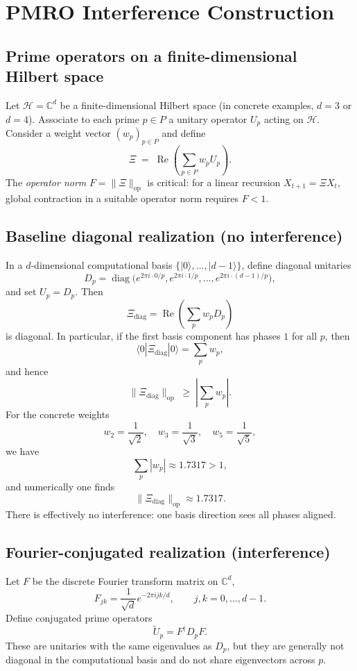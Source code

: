 \documentclass[11pt]{article}
\begin{document}
\section{PMRO Interference Construction}

\subsection{Prime operators on a finite-dimensional Hilbert space}

Let $\mathcal{H}=\mathbb{C}^d$ be a finite-dimensional Hilbert space (in concrete examples, $d=3$ or $d=4$). Associate to each prime $p\in P$ a unitary operator $U_p$ acting on $\mathcal{H}$. Consider a weight vector $(w_p)_{p\in P}$ and define
\[
  \Xi \;=\; \operatorname{Re}\!\left(\sum_{p\in P} w_p U_p\right).
\]
The \emph{operator norm} $F=\|\Xi\|_{\mathrm{op}}$ is critical: for a linear recursion $X_{t+1}=\Xi X_t$, global contraction in a suitable operator norm requires $F<1$.

\subsection{Baseline diagonal realization (no interference)}

In a $d$-dimensional computational basis $\{|0\rangle,\dots,|d-1\rangle\}$, define diagonal unitaries
\[
  D_p = \operatorname{diag}\bigl(e^{2\pi i \cdot 0/p}, e^{2\pi i \cdot 1/p}, \dots, e^{2\pi i \cdot (d-1)/p}\bigr),
\]
and set $U_p=D_p$. Then
\[
  \Xi_{\text{diag}} = \operatorname{Re}\left(\sum_{p} w_p D_p\right)
\]
is diagonal. In particular, if the first basis component has phases $1$ for all $p$, then
\[
  \langle 0|\Xi_{\text{diag}}|0\rangle = \sum_{p} w_p,
\]
and hence
\[
  \|\Xi_{\text{diag}}\|_{\mathrm{op}} \;\geq\; \left|\sum_p w_p\right|.
\]
For the concrete weights
\[
  w_2 = \frac{1}{\sqrt{2}},\quad
  w_3 = \frac{1}{\sqrt{3}},\quad
  w_5 = \frac{1}{\sqrt{5}},
\]
we have
\[
  \sum_p |w_p| \approx 1.7317 > 1,
\]
and numerically one finds
\[
  \|\Xi_{\text{diag}}\|_{\mathrm{op}} \approx 1.7317.
\]
There is effectively no interference: one basis direction sees all phases aligned.

\subsection{Fourier-conjugated realization (interference)}

Let $F$ be the discrete Fourier transform matrix on $\mathbb{C}^d$,
\[
  F_{jk} = \frac{1}{\sqrt{d}} e^{-2\pi i jk/d},\qquad j,k=0,\dots,d-1.
\]
Define conjugated prime operators
\[
  \tilde{U}_p = F^\dagger D_p F.
\]
These are unitaries with the same eigenvalues as $D_p$, but they are generally not diagonal in the computational basis and do not share eigenvectors across $p$.
\end{document}
